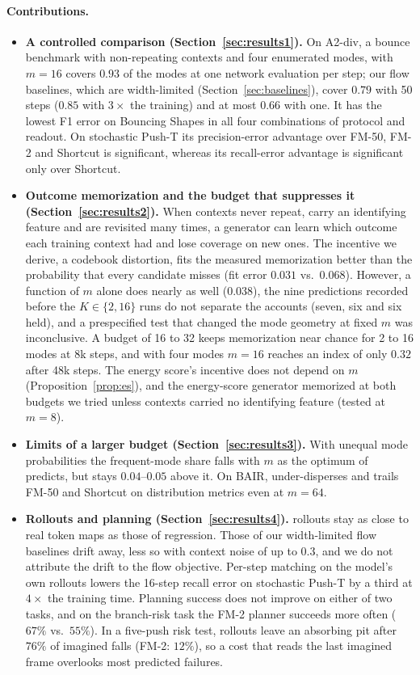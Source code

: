 \paragraph{Contributions.}
{\setlength{\leftmargini}{1.2em}
\begin{itemize}\setlength{\itemsep}{1pt}\setlength{\parsep}{0pt}
\item \textbf{A controlled comparison (Section~\ref{sec:results1}).} On A2-div, a bounce benchmark with non-repeating contexts and four enumerated modes, \imlewm{} with $m{=}16$ covers $0.93$ of the modes at one network evaluation per step; our flow baselines, which are width-limited (Section~\ref{sec:baselines}), cover $0.79$ with 50 steps ($0.85$ with $3\times$ the training) and at most $0.66$ with one. It has the lowest F1 error on Bouncing Shapes in all four combinations of protocol and readout. On stochastic Push-T its precision-error advantage over FM-50, FM-2 and Shortcut is significant, whereas its recall-error advantage is significant only over Shortcut.
\item \textbf{Outcome memorization and the budget that suppresses it (Section~\ref{sec:results2}).} When contexts never repeat, carry an identifying feature and are revisited many times, a generator can learn which outcome each training context had and lose coverage on new ones. The incentive we derive, a codebook distortion, fits the measured memorization better than the probability that every candidate misses (fit error $0.031$ vs.\ $0.068$). However, a function of $m$ alone does nearly as well ($0.038$), the nine predictions recorded before the $K \in \{2,16\}$ runs do not separate the accounts (seven, six and six held), and a prespecified test that changed the mode geometry at fixed $m$ was inconclusive. A budget of 16 to 32 keeps memorization near chance for 2 to 16 modes at 8k steps, and with four modes $m{=}16$ reaches an index of only $0.32$ after 48k steps. The energy score's incentive does not depend on $m$ (Proposition~\ref{prop:es}), and the energy-score generator memorized at both budgets we tried unless contexts carried no identifying feature (tested at $m{=}8$).
\item \textbf{Limits of a larger budget (Section~\ref{sec:results3}).} With unequal mode probabilities the frequent-mode share falls with $m$ as the optimum of \citet{bennett2026freedom} predicts, but stays $0.04$--$0.05$ above it. On BAIR, \imlewm{} under-disperses and trails FM-50 and Shortcut on distribution metrics even at $m{=}64$.
\item \textbf{Rollouts and planning (Section~\ref{sec:results4}).} \imlewm{} rollouts stay as close to real token maps as those of regression. Those of our width-limited flow baselines drift away, less so with context noise of up to $0.3$, and we do not attribute the drift to the flow objective. Per-step matching on the model's own rollouts lowers the 16-step recall error on stochastic Push-T by a third at $4\times$ the training time. Planning success does not improve on either of two tasks, and on the branch-risk task the FM-2 planner succeeds more often ($67\%$ vs.\ $55\%$). In a five-push risk test, \imlewm{} rollouts leave an absorbing pit after $76\%$ of imagined falls (FM-2: $12\%$), so a cost that reads the last imagined frame overlooks most predicted failures.
\end{itemize}}
